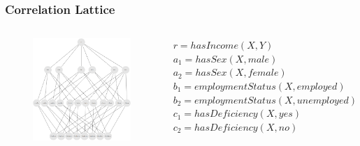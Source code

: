 \documentclass{beamer}
\begin{document}
\begin{frame}
 \frametitle{Correlation Lattice}
 \begin{columns}[c]
    \begin{figure}
     \label{lattice}
      \includegraphics[height=0.7\textheight]{./Figures/lattice}
    \end{figure}
    \fontsize{7}{7}
    $r=hasIncome(X,Y)$ \\
    $a_1=hasSex(X,male)$ \\
    $a_2=hasSex(X,female)$ \\
    $b_1=employmentStatus(X,employed)$ \\
    $b_2=employmentStatus(X,unemployed)$ \\
    $c_1=hasDeficiency(X,yes)$ \\
    $c_2=hasDeficiency(X,no)$ \\
 \end{columns}
\end{frame}
\end{document}
